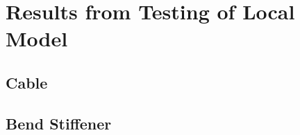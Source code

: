 \chapter{Results from Testing of Local Model}
\label{appendix:B}
\section{Cable}
\section{Bend Stiffener}